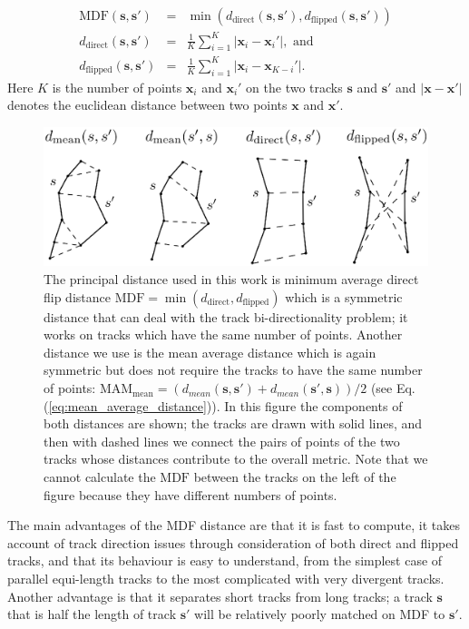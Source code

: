 \documentclass{bioinfo}
\begin{document}
\begin{methods}
\begin{eqnarray}
\textrm{MDF}(\mathbf{s},\mathbf{s'}) & = & \min(d_{\textrm{direct}}(\mathbf{s},\mathbf{s'}),d_{\textrm{flipped}}(\mathbf{s},\mathbf{s'}))\label{eq:direct_flip_distance}\\
d_{\textrm{direct}}(\mathbf{s},\mathbf{s'}) & = & \frac{1}{K}\sum_{i=1}^{K}|\mathbf{x}_{i}-\mathbf{x}_{i}'|,\,\,\textrm{and}\nonumber\\
d_{\textrm{flipped}}(\mathbf{s},\mathbf{s'}) & = & \frac{1}{K}\sum_{i=1}^{K}|\mathbf{x}_{i}-\mathbf{x}_{K-i}'|.\nonumber
\end{eqnarray}
\noindent
Here $K$ is the number of points $\mathbf{x}_{i}$ and $\mathbf{x}_{i}'$ on the two tracks $\mathbf{s}$ and $\mathbf{s'}$
and $|\mathbf{x}-\mathbf{x'}|$ denotes the euclidean distance between two points $\mathbf{x}$ and
$\mathbf{x'}$.

\begin{figure}
\includegraphics[scale=0.35]{Figures/Fig_2_distances2}
\centering{}
\caption{The principal distance used in this work is minimum average direct flip
distance $\textrm{MDF}=\min(d_{\textrm{direct}},d_{\textrm{flipped}})$ which is
a symmetric distance that can deal with the track bi-directionality problem; it
works on tracks which have the same number of points.  Another distance we use is the
mean average distance which is again symmetric but does not require the tracks
to have the same number of points:
$\textrm{MAM}_{\textrm{mean}}=(d_{mean}(\mathbf{s},\mathbf{s'})+d_{mean}(\mathbf{s'},\mathbf{s}))/2$ (see Eq.
(\ref{eq:mean_average_distance})).  In this figure the components of both
distances are shown; the tracks are drawn with solid lines, and then with dashed
lines we connect the pairs of points of the two tracks whose distances
contribute to the overall metric. Note that we cannot calculate the
$\textrm{MDF}$ between the tracks on the left of the figure because they have
different numbers of points.
\label{Flo:Distances_used}}
\end{figure}

The main advantages of the MDF distance are that it is fast to compute,
it takes account of track direction issues through consideration of both
direct and flipped tracks, and that its behaviour is easy to understand,
from the simplest case of parallel equi-length tracks to the most
complicated with very divergent tracks. Another advantage is that it
separates short tracks from long tracks; a track $\mathbf{s}$ that is half the
length of track $\mathbf{s'}$ will be relatively poorly matched on MDF to $\mathbf{s'}$.


\end{methods}
\end{document}
